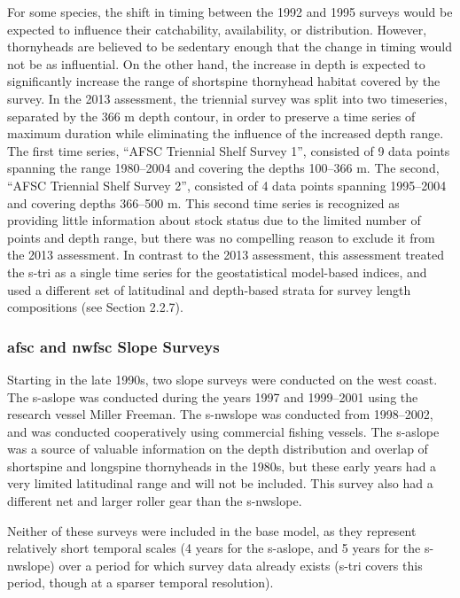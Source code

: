 \documentclass[11pt,
  english,
  letterpaper,
]{article}
\begin{document}
For some species, the shift in timing between the 1992 and 1995 surveys would be expected to influence their catchability, availability, or distribution. However, thornyheads are believed to be sedentary enough that the change in timing would not be as influential. On the other hand, the increase in depth is expected to significantly increase the range of shortspine thornyhead habitat covered by the survey. In the 2013 assessment, the triennial survey was split into two timeseries, separated by the 366 m depth contour, in order to preserve a time series of maximum duration while eliminating the influence of the increased depth range. The first time series, ``AFSC Triennial Shelf Survey 1'', consisted of 9 data points spanning the range 1980--2004 and covering the depths 100--366 m. The second, ``AFSC Triennial Shelf Survey 2'', consisted of 4 data points spanning 1995--2004 and covering depths 366--500 m. This second time series is recognized as providing little information about stock status due to the limited number of points and depth range, but there was no compelling reason to exclude it from the 2013 assessment. In contrast to the 2013 assessment, this assessment treated the \gls{s-tri} as a single time series for the geostatistical model-based indices, and used a different set of latitudinal and depth-based strata for survey length compositions (see Section 2.2.7).

\hypertarget{and-slope-surveys}{%
\subsubsection{\texorpdfstring{\acrshort{afsc} and \acrshort{nwfsc} Slope Surveys}{ and  Slope Surveys}}\label{and-slope-surveys}}

Starting in the late 1990s, two slope surveys were conducted on the west coast. The \gls{s-aslope} was conducted during the years 1997 and 1999--2001 using the research vessel Miller Freeman. The \gls{s-nwslope} was conducted from 1998--2002, and was conducted cooperatively using commercial fishing vessels. The \gls{s-aslope} was a source of valuable information on the depth distribution and overlap of shortspine and longspine thornyheads in the 1980s, but these early years had a very limited latitudinal range and will not be included. This survey also had a different net and larger roller gear than the \gls{s-nwslope}.

Neither of these surveys were included in the base model, as they represent relatively short temporal scales (4 years for the \gls{s-aslope}, and 5 years for the \gls{s-nwslope}) over a period for which survey data already exists (\gls{s-tri} covers this period, though at a sparser temporal resolution).
\end{document}
